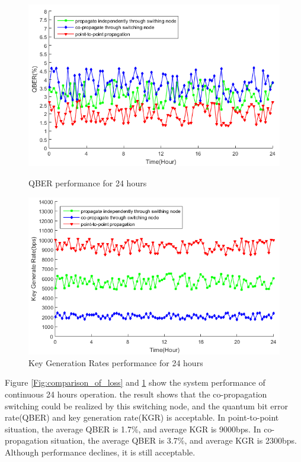 \documentclass[letterpaper,10pt]{article}
\begin{document}
\begin{figure}[!htb]
   \begin{minipage}{0.48\textwidth}
     \centering
     \includegraphics[width=.9\linewidth]{qber_experiment}
     \caption{QBER performance for 24 hours} \label{Fig:comparison_of_loss}
   \end{minipage}\hfill
   \begin{minipage}{0.48\textwidth}
     \centering
     \includegraphics[width=.9\linewidth]{key_rate_experiment}
     \caption{Key Generation Rates performance for 24 hours} \label{Fig:comparison_of_rate}
   \end{minipage}
\end{figure}
Figure \ref{Fig:comparison_of_loss} and \ref{Fig:comparison_of_rate} show the system performance of continuous 24 hours operation. the result shows that the co-propagation switching could be realized by this switching node, and the quantum bit error rate(QBER) and key generation rate(KGR) is acceptable. In point-to-point situation, the average QBER is 1.7\%, and average KGR is 9000bps. In co-propagation situation, the average QBER is 3.7\%, and average KGR is 2300bps. Although performance declines, it is still acceptable.
\end{document}
